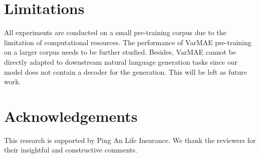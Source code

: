 \documentclass[11pt]{article}
\begin{document}
\section*{Limitations}
All experiments are conducted on a small pre-training corpus  due to the limitation of computational resources. The performance of VarMAE pre-training on a larger corpus  needs to be further studied. 
Besides, VarMAE cannot be directly adapted to downstream natural language generation tasks since our model does not contain a decoder for the generation. 
This will be left as future work. 

\vspace{-0.5mm}
\section*{Acknowledgements}
This research is supported by Ping An Life Insurance. We thank the reviewers for their insightful and constructive comments. 
\end{document}
